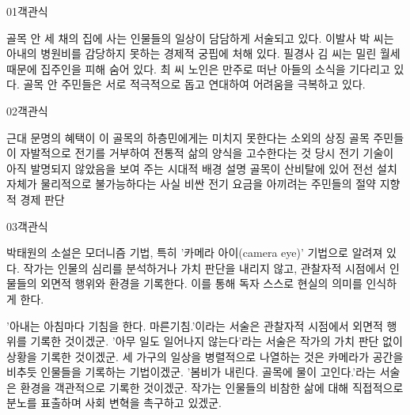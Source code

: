 \documentclass[fs85,seriesWit]{korfarm-base}
\begin{document}
\kfBeginMC
\begin{kfQBlock}{01}{객관식}
\begin{kfChoices}
\kfChoice 골목 안 세 채의 집에 사는 인물들의 일상이 담담하게 서술되고 있다.
\kfChoice 이발사 박 씨는 아내의 병원비를 감당하지 못하는 경제적 궁핍에 처해 있다.
\kfChoice 필경사 김 씨는 밀린 월세 때문에 집주인을 피해 숨어 있다.
\kfChoice 최 씨 노인은 만주로 떠난 아들의 소식을 기다리고 있다.
\kfChoice 골목 안 주민들은 서로 적극적으로 돕고 연대하여 어려움을 극복하고 있다.
\end{kfChoices}
\end{kfQBlock}

\begin{kfQBlock}{02}{객관식}
\begin{kfChoices}
\kfChoice 근대 문명의 혜택이 이 골목의 하층민에게는 미치지 못한다는 소외의 상징
\kfChoice 골목 주민들이 자발적으로 전기를 거부하여 전통적 삶의 양식을 고수한다는 것
\kfChoice 당시 전기 기술이 아직 발명되지 않았음을 보여 주는 시대적 배경 설명
\kfChoice 골목이 산비탈에 있어 전선 설치 자체가 물리적으로 불가능하다는 사실
\kfChoice 비싼 전기 요금을 아끼려는 주민들의 절약 지향적 경제 판단
\end{kfChoices}
\end{kfQBlock}

\begin{kfQBlock}{03}{객관식}
\begin{kfEvidence}박태원의 소설은 모더니즘 기법, 특히 '카메라 아이(camera eye)' 기법으로 알려져 있다. 작가는 인물의 심리를 분석하거나 가치 판단을 내리지 않고, 관찰자적 시점에서 인물들의 외면적 행위와 환경을 기록한다. 이를 통해 독자 스스로 현실의 의미를 인식하게 한다.\end{kfEvidence}
\begin{kfChoices}
\kfChoice '아내는 아침마다 기침을 한다. 마른기침.'이라는 서술은 관찰자적 시점에서 외면적 행위를 기록한 것이겠군.
\kfChoice '아무 일도 일어나지 않는다'라는 서술은 작가의 가치 판단 없이 상황을 기록한 것이겠군.
\kfChoice 세 가구의 일상을 병렬적으로 나열하는 것은 카메라가 공간을 비추듯 인물들을 기록하는 기법이겠군.
\kfChoice '봄비가 내린다. 골목에 물이 고인다.'라는 서술은 환경을 객관적으로 기록한 것이겠군.
\kfChoice 작가는 인물들의 비참한 삶에 대해 직접적으로 분노를 표출하며 사회 변혁을 촉구하고 있겠군.
\end{kfChoices}
\end{kfQBlock}
\end{document}
